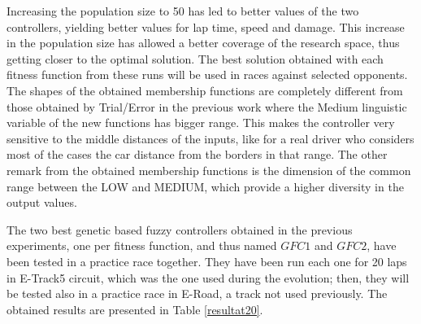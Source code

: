 \documentclass[conference]{IEEEtran}
\begin{document}
Increasing the population size to 50  has led to better values of the
two controllers, yielding better values for lap time, speed and
damage. This increase in the population size has allowed a better
coverage of the research space, thus getting closer to the optimal
solution.  
The best solution obtained with each fitness function from these runs
will be used in races against selected opponents. 
%
The shapes of the obtained membership functions are completely different from
those obtained by Trial/Error in the previous work \cite{evo17}
where the Medium linguistic variable of the new functions has bigger
range. This makes the controller very sensitive to the middle
distances of the inputs, like for a real driver who considers most of
the cases the car distance from the borders in that range. 
The other remark from the obtained  membership functions is the
dimension of the common range between the LOW and MEDIUM, which
provide a higher diversity in the output values. 


The two best genetic based fuzzy controllers obtained in the previous
experiments, one per fitness function, and thus named $GFC1$ and
$GFC2$, have been tested
in a practice race together. They have been run %
each one for 20 laps in E-Track5 circuit, which was the one used during the
evolution; then, they will be tested also in a practice race in
E-Road, a track not used previously. The obtained results are presented
in Table \ref{resultat20}. 
\end{document}
